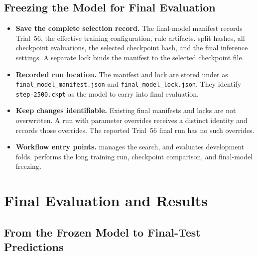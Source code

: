\documentclass[11pt]{article}
\newenvironment{notes}
  {\begin{itemize}\setlength{\itemsep}{0.45em}\setlength{\parsep}{0pt}}
  {\end{itemize}}
\begin{document}
\subsection{Freezing the Model for Final Evaluation}
\label{sec:final-model-lock}

\begin{notes}
    \item \textbf{Save the complete selection record.}
    The final-model manifest records Trial~56, the effective
    training configuration, rule artifacts, split hashes,
    all checkpoint evaluations, the selected checkpoint
    hash, and the final inference settings.
    A separate lock binds the manifest to the selected
    checkpoint file.

    \item \textbf{Recorded run location.}
    The manifest and lock are stored under
    as \texttt{final\_model\_manifest.json} and
    \texttt{final\_model\_lock.json}.
    They identify \texttt{step-2500.ckpt} as the model to
    carry into final evaluation.

    \item \textbf{Keep changes identifiable.}
    Existing final manifests and locks are not overwritten.
    A run with parameter overrides receives a distinct
    identity and records those overrides.
    The reported Trial~56 final run has no such overrides.

    \item \textbf{Workflow entry points.}
     manages the
    search, and
    evaluates development folds.
     performs
    the long training run, checkpoint comparison, and
    final-model freezing.
\end{notes}

\section{Final Evaluation and Results}
\label{sec:final-evaluation}

\subsection{From the Frozen Model to Final-Test Predictions}
\label{sec:final-prediction-task}
\end{document}
